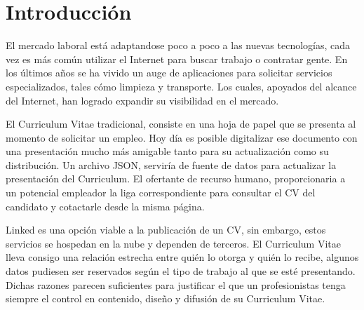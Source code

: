 \section{Introducción}
  El mercado laboral está adaptandose poco a poco a las nuevas tecnologías, cada vez es más común utilizar el Internet para buscar trabajo o contratar gente. En los últimos años se ha vivido un auge de aplicaciones para solicitar servicios especializados, tales cómo limpieza y transporte. Los cuales, apoyados del alcance del Internet, han logrado expandir su visibilidad en el mercado.

  El Curriculum Vitae tradicional, consiste en una hoja de papel que se presenta al momento de solicitar un empleo. Hoy día es posible digitalizar ese documento con una presentación mucho más amigable tanto para su actualización como su distribución. Un archivo JSON, serviría de fuente de datos para actualizar la presentación del Curriculum. El ofertante de recurso humano, proporcionaria a un potencial empleador la liga correspondiente para consultar el CV del candidato y cotactarle desde la misma página.

  Linked es una opción viable a la publicación de un CV, sin embargo, estos servicios se hospedan en la nube y dependen de terceros. El Curriculum Vitae lleva consigo una relación estrecha entre quién lo otorga y quién lo recibe, algunos datos pudiesen ser reservados según el tipo de trabajo al que se esté presentando. Dichas razones parecen suficientes para justificar el que un profesionistas tenga siempre el control en contenido, diseño y difusión de su Curriculum Vitae.
